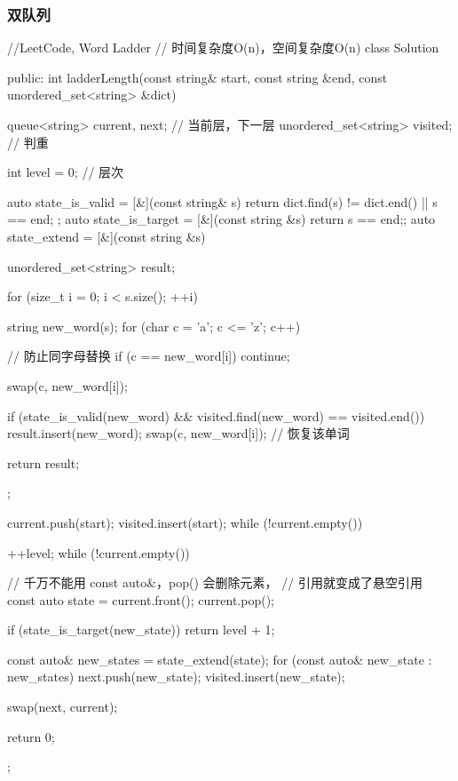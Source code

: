 \subsubsection{双队列}
\begin{Code}
//LeetCode, Word Ladder
// 时间复杂度O(n)，空间复杂度O(n)
class Solution {
public:
    int ladderLength(const string& start, const string &end,
            const unordered_set<string> &dict) {
        queue<string> current, next;    // 当前层，下一层
        unordered_set<string> visited;  // 判重

        int level = 0;  // 层次

        auto state_is_valid = [&](const string& s) {
            return dict.find(s) != dict.end() || s == end;
        };
        auto state_is_target = [&](const string &s) {return s == end;};
        auto state_extend = [&](const string &s) {
            unordered_set<string> result;

            for (size_t i = 0; i < s.size(); ++i) {
                string new_word(s);
                for (char c = 'a'; c <= 'z'; c++) {
                    // 防止同字母替换
                    if (c == new_word[i]) continue;

                    swap(c, new_word[i]);

                    if (state_is_valid(new_word) &&
                        visited.find(new_word) == visited.end()) {
                        result.insert(new_word);
                    }
                    swap(c, new_word[i]); // 恢复该单词
                }
            }

            return result;
        };

        current.push(start);
        visited.insert(start);
        while (!current.empty()) {
            ++level;
            while (!current.empty()) {
                // 千万不能用 const auto&，pop() 会删除元素，
                // 引用就变成了悬空引用
                const auto state = current.front();
                current.pop();

                if (state_is_target(new_state)) {
                    return level + 1;
                }

                const auto& new_states = state_extend(state);
                for (const auto& new_state : new_states) {
                    next.push(new_state);
                    visited.insert(new_state);
                }
            }
            swap(next, current);
        }
        return 0;
    }
};
\end{Code}


